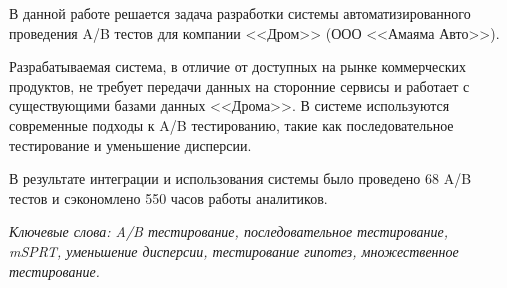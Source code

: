 \documentclass[../document.tex]{subfiles}
\begin{document}
	\par В данной работе решается задача разработки системы автоматизированного проведения A/B тестов для компании <<Дром>> (ООО <<Амаяма Авто>>).
	\par Разрабатываемая система, в отличие от доступных на рынке коммерческих продуктов, не требует передачи данных на сторонние сервисы и работает с существующими базами данных <<Дрома>>. В системе используются современные подходы к A/B тестированию, такие как последовательное тестирование и уменьшение дисперсии.
	\par В результате интеграции и использования системы было проведено 68 A/B тестов и сэкономлено 550 часов работы аналитиков.
	\par \textit{Ключевые слова: A/B тестирование, последовательное тестирование,\\ 
		mSPRT, уменьшение дисперсии, тестирование гипотез, множественное тестирование.}
\end{document}
